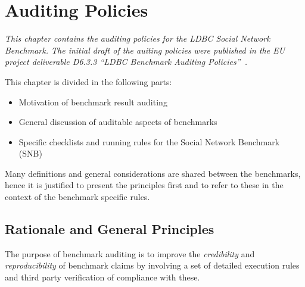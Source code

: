 \chapter{Auditing Policies}
\label{sec:auditing}

\emph{This chapter contains the auditing policies for the LDBC Social Network Benchmark. The initial draft of the auiting policies were published in the EU project deliverable D6.3.3 ``LDBC Benchmark Auditing Policies''~\cite{LdbcAuditingPoliciesDeliverable}.}


This chapter is divided in the following parts:
\begin{itemize}
    \item Motivation of benchmark result auditing
    \item General discussion of auditable aspects of benchmarks
    \item Specific checklists and running rules for the Social Network Benchmark (SNB)
\end{itemize}
Many definitions and general considerations are shared between the benchmarks, hence it is justified to present the principles first and to refer to these in the context of the benchmark specific rules.


\section{Rationale and General Principles}


The purpose of benchmark auditing is to improve the \emph{credibility} and \emph{reproducibility} of benchmark claims by involving a set of detailed execution rules and third party verification of compliance with these.

